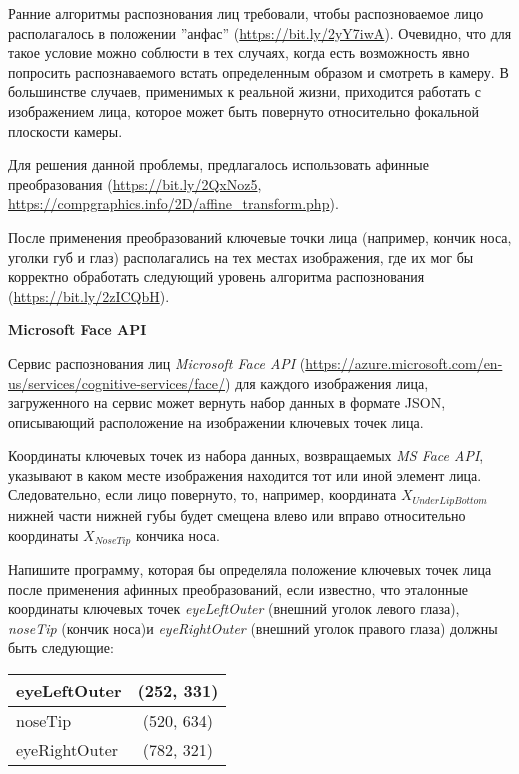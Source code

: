 
Ранние алгоритмы распознования лиц требовали, чтобы распозноваемое лицо располагалось в положении ''анфас'' (\url{https://bit.ly/2yY7iwA}).
Очевидно, что для такое условие можно соблюсти в тех случаях, когда есть возможность явно попросить распознаваемого встать определенным образом и смотреть в камеру.
В большинстве случаев, применимых к реальной жизни, приходится работать с изображением лица, которое может быть повернуто относительно фокальной плоскости камеры.

Для решения данной проблемы, предлагалось использовать афинные преобразования (\url{https://bit.ly/2QxNoz5}, \url{https://compgraphics.info/2D/affine_transform.php}).


После применения преобразований ключевые точки лица (например, кончик носа, уголки губ и глаз) располагались на тех местах изображения, где их мог бы корректно обработать следующий уровень алгоритма распознования (\url{https://bit.ly/2zICQbH}).

\textbf{Microsoft Face API}

Сервис распознования лиц \textit{Microsoft Face API} (\url{https://azure.microsoft.com/en-us/services/cognitive-services/face/}) для каждого изображения лица, загруженного на сервис может вернуть набор данных в формате JSON, описывающий расположение на изображении ключевых точек лица.


Координаты ключевых точек из набора данных, возвращаемых \textit{MS Face API}, указывают в каком месте изображения находится тот или иной элемент лица.
Следовательно, если лицо повернуто, то, например, координата $X_{UnderLipBottom}$ нижней части нижней губы будет смещена влево или вправо относительно координаты $X_{NoseTip}$ кончика носа.

Напишите программу, которая бы определяла положение ключевых точек лица после применения афинных преобразований, если известно, что эталонные координаты ключевых точек \textit{eyeLeftOuter} (внешний уголок левого глаза), \textit{noseTip} (кончик носа)и \textit{eyeRightOuter} (внешний уголок правого глаза) должны быть следующие:

\begin{table}[H]
\centering
\begin{tabular}{|l|c|}
\hline
eyeLeftOuter  & (252, 331) \\ \hline
noseTip       & (520, 634) \\ \hline
eyeRightOuter & (782, 321) \\
\hline
\end{tabular}
\end{table}

